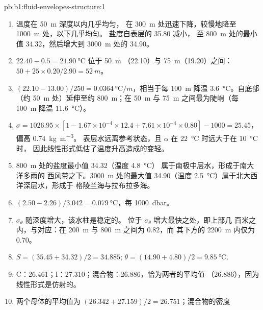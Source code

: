 \begin{solution}{pb:b1:fluid-envelopes-structure:1}
\begin{enumerate}
  \item 温度在 \qty{50}{m} 深度以内几乎均匀，
        在 \qty{300}{m} 处迅速下降，较慢地降至 \qty{1000}{m} 处，以下几乎均匀。
        盐度自表层的 35.80 减小，
        至 \qty{800}{m} 处的最小值 34.32，然后增大到 \qty{3000}{m} 处的 34.90。
  \item $22.40 - 0.5 = \qty{21.90}{\celsius}$ 位于 \qty{50}{m}
        （22.10）与 \qty{75}{m}（19.20）之间：$50 + 25 \times 0.20/2.90 = \qty{52}{m}$。
  \item $(22.10 - 13.00)/250 = \qty{0.0364}{\celsius/m}$，相当于每
        \qty{100}{m} 降温 \qty{3.6}{\celsius}。自底部
        （约 \qty{50}{m} 处）延伸至约 \qty{800}{m}；在
        \qty{50}{m} 与 \qty{75}{m} 之间最为陡峭（每 \qty{100}{m} 降温 \qty{11.6}{\celsius}）。
  \item $\sigma = 1026.95 \times [1 - 1.67\times10^{-4} \times 12.4 +
        7.61\times10^{-4} \times 0.80] - 1000 = 25.45$，偏高 \qty{0.74}{kg.m^{-3}}。
        表层水远离参考状态，且 $\alpha$
        在 \qty{22}{\celsius} 时远大于在 \qty{10}{\celsius} 时，
        因此线性形式低估了温度升高造成的变轻。
  \item \qty{800}{m} 处的盐度最小值 34.32（温度 \qty{4.8}{\celsius}）
        属于南极中层水，形成于南大洋多雨的
        西风带之下。\qty{3000}{m} 处的最大值 34.90（温度
        \qty{2.5}{\celsius}）属于北大西洋深层水，形成于
        格陵兰海与拉布拉多海。
  \item $(2.50 - 2.26)/3.042 = \qty{0.079}{\celsius}$，每 \qty{1000}{dbar}。
  \item $\sigma_\theta$ 随深度增大，该水柱是稳定的。
        位于 $\sigma_\theta$ 增大最快之处，即上部几
        百米之内，与对应：在
        \qty{200}{m} 与 \qty{800}{m} 之间为 \num{0.82}，而
        其下方的 \qty{2200}{m} 内仅为 \num{0.70}。
  \item $S = (35.45 + 34.32)/2 = 34.885$; $\theta = (14.90 + 4.80)/2 =
        \qty{9.85}{\celsius}$.
  \item C：26.461；I：27.310；混合物：26.886，恰为两者的平均值
        （26.886），因为线性形式是仿射的。
  \item 两个母体的平均值为 $(26.342 + 27.159)/2 = 26.751$；混合物的密度

\end{enumerate}
\end{solution}
